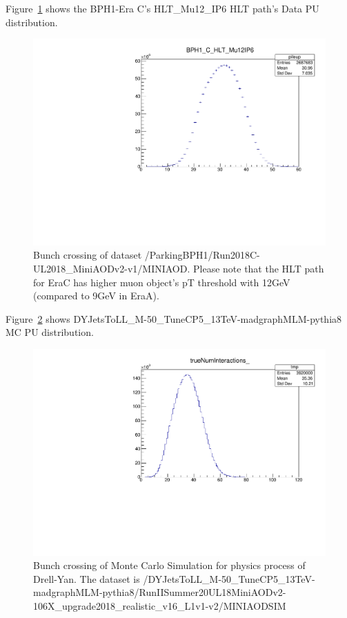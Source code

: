 Figure~\ref{fig:EraCData} shows the BPH1-Era C's HLT\_Mu12\_IP6 HLT path's Data PU distribution.
\begin{figure}[h!]
\caption{Bunch crossing of dataset /ParkingBPH1/Run2018C-UL2018\_MiniAODv2-v1/MINIAOD. Please note that the HLT path for EraC has higher muon object's pT threshold with 12GeV (compared to 9GeV in EraA).}
  \label{fig:EraCData}
  \centering
  \includegraphics[width=0.67\linewidth]{figs/BPH1CData.pdf}

\end{figure}

Figure~\ref{fig:MCPU} shows DYJetsToLL\_M-50\_TuneCP5\_13TeV-madgraphMLM-pythia8 MC PU distribution.
\begin{figure}[h!]
	\caption{Bunch crossing of Monte Carlo Simulation for physics process of Drell-Yan. The dataset is /DYJetsToLL\_M-50\_TuneCP5\_13TeV-madgraphMLM-pythia8/RunIISummer20UL18MiniAODv2-106X\_upgrade2018\_realistic\_v16\_L1v1-v2/MINIAODSIM}
  \label{fig:MCPU}
  \centering
  \includegraphics[width=0.67\linewidth]{figs/mcPU.pdf}

\end{figure}

